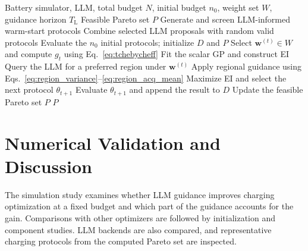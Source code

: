 \documentclass[journal,10pt]{IEEEtran}
\begin{document}
\begin{algorithm}[t]
\caption{LLMBO-MO}
\label{alg:llmbo}
\footnotesize
\begin{algorithmic}[1]
\Require Battery simulator, LLM, total budget $N$, initial budget $n_0$, weight set $W$, guidance horizon $T_{\mathrm L}$
\Ensure Feasible Pareto set $P$
\State Generate and screen LLM-informed warm-start protocols
\State Combine selected LLM proposals with random valid protocols
\State Evaluate the $n_0$ initial protocols; initialize $D$ and $P$
    \State Select $\mathbf w^{(t)}\in W$ and compute $g_t$ using Eq.~\eqref{eq:tchebycheff}
    \State Fit the scalar GP and construct EI
        \State Query the LLM for a preferred region under $\mathbf w^{(t)}$
            \State Apply regional guidance using Eqs.~\eqref{eq:region_variance}--\eqref{eq:region_acq_mean}
        \EndIf
    \EndIf
    \State Maximize EI and select the next protocol $\theta_{t+1}$
    \State Evaluate $\theta_{t+1}$ and append the result to $D$
    \State Update the feasible Pareto set $P$
\EndFor
\State \Return $P$
\end{algorithmic}
\end{algorithm}
\section{Numerical Validation and Discussion}
\label{sec:experiments}

The simulation study examines whether LLM guidance improves charging
optimization at a fixed budget and which part of the guidance accounts for the
gain. Comparisons with other optimizers are followed by initialization and
component studies. LLM backends are also compared, and representative
charging protocols from the computed Pareto set are inspected.
\end{document}
